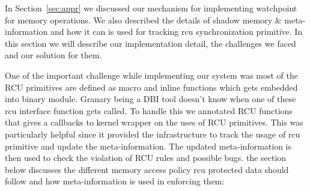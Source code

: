 In Section~\ref{sec:appr} we discussed our mechanism for implementing watchpoint for memory operations. We also described the details of shadow memory \& meta-information and how it can is used for tracking rcu synchronization primitive. In this section we will describe our implementation detail, the challenges we faced and our solution for them.

One of the important challenge while implementing our system was most of the RCU primitives are defined as macro and inline functions which gets embedded into binary module. Granary being a DBI tool doesn’t know when one of these rcu interface function gets called. To handle this we annotated RCU functions that gives a callbacks to kernel wrapper on the uses of RCU primitives. This was particularly helpful since it provided the infrastructure to track the usage of rcu primitive and update the meta-information. The updated meta-information is then used to check the violation of RCU rules and possible bugs. the section below discusses the different memory access policy rcu protected data should follow and how meta-information is used in enforcing them: 

